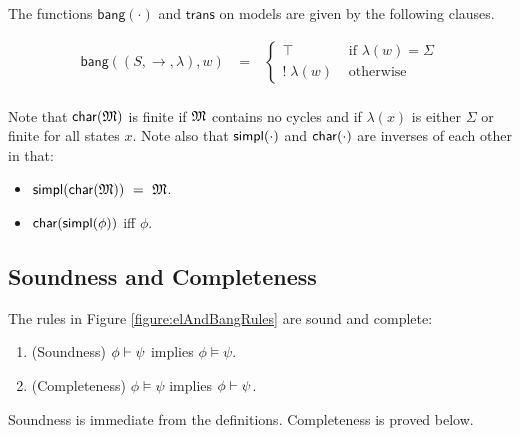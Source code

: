 \NI The functions $\mathsf{bang}(\cdot)$ and $\mathsf{trans}$ on
models are given by the following clauses.

\begin{eqnarray*}
  \mathsf{bang}((S,\rightarrow,\lambda),w) 
     & \ = \ & 
  \begin{cases}
    \top & \mbox{ if } \lambda(w) = \Sigma  \\
    ! \; \lambda(w) & \mbox{ otherwise }  
  \end{cases} \\
\end{eqnarray*}

\NI Note that $\mathsf{char}(\frak{M})$ is finite if $\frak{M}$ contains no cycles and if
$\lambda(x)$ is either $\Sigma$ or finite for all states $x$.
Note also that $\mathsf{simpl}(\cdot)$ and $\mathsf{char}(\cdot)$ are inverses of each other in that:

\begin{itemize}

\item $\mathsf{simpl}(\mathsf{char}(\frak{M})) \ = \  \frak{M}$. 

\item $\mathsf{char}(\mathsf{simpl}(\phi))$ iff $\phi$.

\end{itemize}


\subsection{Soundness and Completeness}

\begin{theorem}\label{theorem:elAndBang:soundComplete}
The rules in Figure \ref{figure:elAndBangRules} are sound and complete:
\begin{enumerate}

\item\label{theorem:elAndBang:sound} (Soundness) $\phi \vdash \psi$ implies $\phi \models \psi$.

\item\label{theorem:elAndBang:complete} (Completeness) $\phi \models \psi$ implies $\phi \vdash \psi$.

\end{enumerate}
\end{theorem}

\NI Soundness is immediate from the definitions. Completeness is
proved below. 


